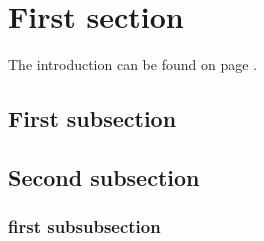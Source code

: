 \lipsum[1]

\section{First section}
The introduction can be found on page \pageref{sec:introduction}.
\subsection{First subsection}
\lipsum[1-3]

\subsection{Second subsection}
\lipsum[1]

\subsubsection{first subsubsection}
\lipsum[1]